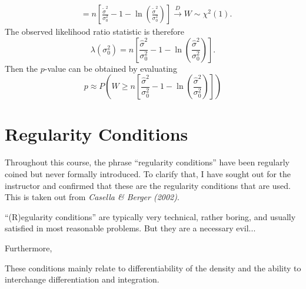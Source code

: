 \documentclass[notoc,notitlepage]{tufte-book}
\newcommand{\convd}{\overset{D}{\to}}
\begin{document}
\begin{solution}
\begin{align*}
                        &= n \left[ \frac{\tilde{\sigma}^2}{\sigma_0^2} - 1 - \ln \left( \frac{\tilde{\sigma}^2}{\sigma_0^2} \right) \right] \convd W \sim \chi^2(1).
  \end{align*}
  The observed likelihood ratio statistic is therefore
  \begin{equation*}
    \lambda(\sigma_0^2) = n \left[ \frac{\hat{\sigma}^2}{\sigma_0^2} - 1 - \ln \left( \frac{\hat{\sigma}^2}{\sigma_0^2} \right) \right].
  \end{equation*}
  Then the $p$-value can be obtained by evaluating
  \begin{equation*}
    p \approx P\left(W \geq n \left[ \frac{\hat{\sigma}^2}{\sigma_0^2} - 1 - \ln \left( \frac{\hat{\sigma}^2}{\sigma_0^2} \right) \right]\right)
  \end{equation*}
\end{solution}




\appendix

\chapter{Regularity Conditions}%
\label{chp:regularity_conditions}

Throughout this course, the phrase ``regularity conditions'' have been regularly coined but never formally introduced. To clarify that, I have sought out for the instructor and confirmed that these are the regularity conditions that are used. This is taken out from \textit{Casella \& Berger (2002)}\cite{CasellaBerger2002}.

\begin{displayquote}
  ``(R)egularity conditions'' are typically very technical, rather boring, and usually satisfied in most reasonable problems. But they are a necessary evil...
\end{displayquote}

\noindent Furthermore,

\begin{displayquote}
  These conditions mainly relate to differentiability of the density and the ability to interchange differentiation and integration.
\end{displayquote}
\end{document}

